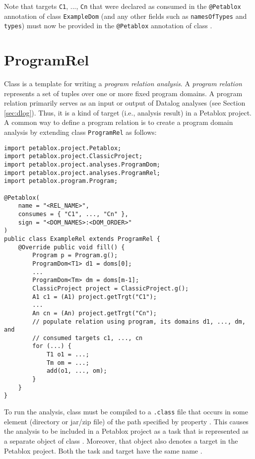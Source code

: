 Note that targets {\tt C1}, ..., {\tt Cn} that were declared as consumed in
the {\tt @Petablox} annotation of class {\tt ExampleDom} (and any other fields
such as {\tt namesOfTypes} and {\tt types}) must now be provided in the
{\tt @Petablox} annotation of class .

\section{ProgramRel}
\label{sec:program-rel}

Class 
is a template for writing a {\it program relation analysis}.
A {\it program relation} represents a set of tuples over one or more fixed 
program domains.  A program relation primarily serves as an input or output of
Datalog analyses (see Section \ref{sec:dlog}).  Thus, it is a kind of
target (i.e., analysis result) in a Petablox project.  A common way to define a
program relation is to create a program domain analysis by extending class
{\tt ProgramRel} as follows:

\begin{framed}
\begin{verbatim}
import petablox.project.Petablox;
import petablox.project.ClassicProject;
import petablox.project.analyses.ProgramDom;
import petablox.project.analyses.ProgramRel;
import petablox.program.Program;

@Petablox(
    name = "<REL_NAME>",
    consumes = { "C1", ..., "Cn" },
    sign = "<DOM_NAMES>:<DOM_ORDER>"
)
public class ExampleRel extends ProgramRel {
    @Override public void fill() {
        Program p = Program.g();
        ProgramDom<T1> d1 = doms[0];
        ...
        ProgramDom<Tm> dm = doms[m-1];
        ClassicProject project = ClassicProject.g();
        A1 c1 = (A1) project.getTrgt("C1");
        ...
        An cn = (An) project.getTrgt("Cn");
        // populate relation using program, its domains d1, ..., dm, and
        // consumed targets c1, ..., cn
        for (...) {
            T1 o1 = ...;
            Tm om = ...;
            add(o1, ..., om); 
        }
    }
}
\end{verbatim}
\end{framed}

To run the analysis, class  must be compiled to a {\tt .class}
file that occurs in some element (directory or jar/zip file) of the path
specified by property .  This causes the
analysis to be included in a Petablox project as a task that is represented as a
separate object of class .  Moreover, that object also denotes
a target in the Petablox project.  Both the task and target have the same name
.

